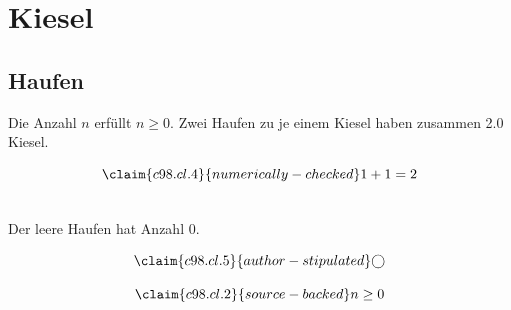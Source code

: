 \chapter{Kiesel}\label{c98}
\section{Haufen}\label{c98.s1}

\begin{theorem}[Anzahl]\label{c98.thm.count}
  Die Anzahl $n$ erfüllt $n \geq 0$.
  Zwei Haufen zu je einem Kiesel haben zusammen
  \num[c98.cl.4]{2.0}{} Kiesel.
\end{theorem}

\begin{equation}\label{c98.eq.sum}\claim{c98.cl.4}{numerically-checked}
  1 + 1 = 2
\end{equation}

\begin{lemma}[Leer]\label{c98.lem.empty}\\%
  Der leere Haufen hat Anzahl $0$.
\end{lemma}

\begin{equation}\label{c98.eq.circle}\claim{c98.cl.5}{author-stipulated}
  \bigcirc
\end{equation}

\begin{vertiefung}[id=c98.v1, titel={T}, wozu={W}, voraussetzung={V}, zurueck={Z}]
  \begin{equation}\label{c98.eq.page}\claim{c98.cl.2}{source-backed}
    n \geq 0
  \end{equation}
\end{vertiefung}
